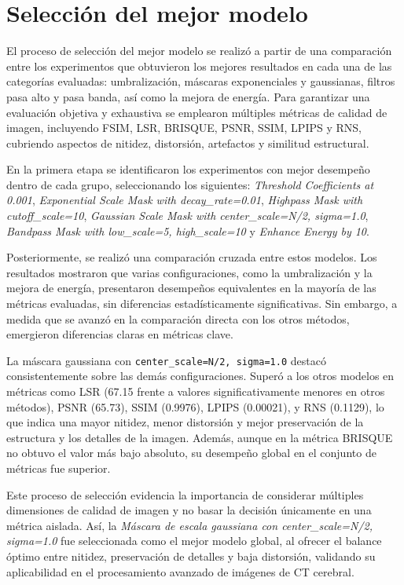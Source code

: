 \section{Selección del mejor modelo}

El proceso de selección del mejor modelo se realizó a partir de una comparación entre los experimentos que obtuvieron los mejores resultados en cada una de las categorías evaluadas: umbralización, máscaras exponenciales y gaussianas, filtros pasa alto y pasa banda, así como la mejora de energía. Para garantizar una evaluación objetiva y exhaustiva se emplearon múltiples métricas de calidad de imagen, incluyendo FSIM, LSR, BRISQUE, PSNR, SSIM, LPIPS y RNS, cubriendo aspectos de nitidez, distorsión, artefactos y similitud estructural.

En la primera etapa se identificaron los experimentos con mejor desempeño dentro de cada grupo, seleccionando los siguientes: \textit{Threshold Coefficients at 0.001}, \textit{Exponential Scale Mask with decay\_rate=0.01}, \textit{Highpass Mask with cutoff\_scale=10}, \textit{Gaussian Scale Mask with center\_scale=N/2, sigma=1.0}, \textit{Bandpass Mask with low\_scale=5, high\_scale=10} y \textit{Enhance Energy by 10}.

Posteriormente, se realizó una comparación cruzada entre estos modelos. Los resultados mostraron que varias configuraciones, como la umbralización y la mejora de energía, presentaron desempeños equivalentes en la mayoría de las métricas evaluadas, sin diferencias estadísticamente significativas. Sin embargo, a medida que se avanzó en la comparación directa con los otros métodos, emergieron diferencias claras en métricas clave.

La máscara gaussiana con \texttt{center\_scale=N/2, sigma=1.0} destacó consistentemente sobre las demás configuraciones. Superó a los otros modelos en métricas como LSR (67.15 frente a valores significativamente menores en otros métodos), PSNR (65.73), SSIM (0.9976), LPIPS (0.00021), y RNS (0.1129), lo que indica una mayor nitidez, menor distorsión y mejor preservación de la estructura y los detalles de la imagen. Además, aunque en la métrica BRISQUE no obtuvo el valor más bajo absoluto, su desempeño global en el conjunto de métricas fue superior.

Este proceso de selección evidencia la importancia de considerar múltiples dimensiones de calidad de imagen y no basar la decisión únicamente en una métrica aislada. Así, la \textit{Máscara de escala gaussiana con center\_scale=N/2, sigma=1.0} fue seleccionada como el mejor modelo global, al ofrecer el balance óptimo entre nitidez, preservación de detalles y baja distorsión, validando su aplicabilidad en el procesamiento avanzado de imágenes de CT cerebral.

